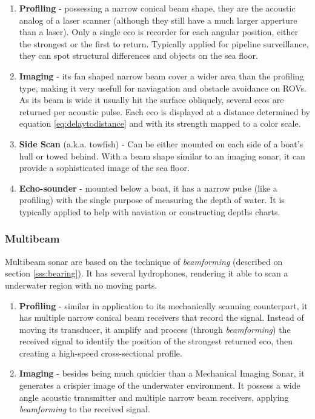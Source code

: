 \begin{enumerate}
  \item \textbf{Profiling} - possessing a narrow conical beam shape, they are the
  acoustic analog of a laser scanner (although they still have a much larger
  apperture than a laser). Only a single eco is recorder for each angular
  position, either the strongest or the first to return. Typically applied for
  pipeline surveillance, they can spot structural differences and objects on the
  sea floor.
  \item \textbf{Imaging} - its fan shaped narrow beam cover a wider area than
  the profiling type, making it very usefull for naviagation and obstacle
  avoidance on ROVs. As its beam is wide it usually hit the surface obliquely,
  several ecos are returned per acoustic pulse. Each eco is displayed at a
  distance determined by equation \ref{eq:delaytodistance} and with its strength
  mapped to a color scale.
  \item \textbf{Side Scan} (a.k.a. towfish) - Can be either mounted on each side
  of a boat's hull or towed behind. With a beam shape similar to an imaging
  sonar, it can provide a sophisticated image of the sea floor.
  \item \textbf{Echo-sounder} - mounted below a boat, it has a narrow pulse
  (like a profiling) with the single purpose of measuring the depth of water. It
  is typically applied to help with naviation or constructing depths charts.
\end{enumerate}


\subsubsection{Multibeam}

Multibeam sonar are based on the technique of \textit{beamforming} (described
on section \ref{sss:bearing}). It has several hydrophones, rendering it able to
scan a underwater region with no moving parts.

\begin{enumerate}
  \item \textbf{Profiling} - similar in application to its mechanically scanning
  counterpart, it has multiple narrow conical beam receivers that record the
  signal. Instead of moving its transducer, it amplify and process (through
  \textit{beamforming}) the received signal to identify the position of the
  strongest returned eco, then creating a high-speed cross-sectional profile.
  \item \textbf{Imaging} - besides being much quickier than a Mechanical Imaging
  Sonar, it generates a crispier image of the underwater environment. It possess
  a wide angle acoustic transmitter and multiple narrow beam receivers, applying
  \textit{beamforming} to the received signal.
\end{enumerate}

